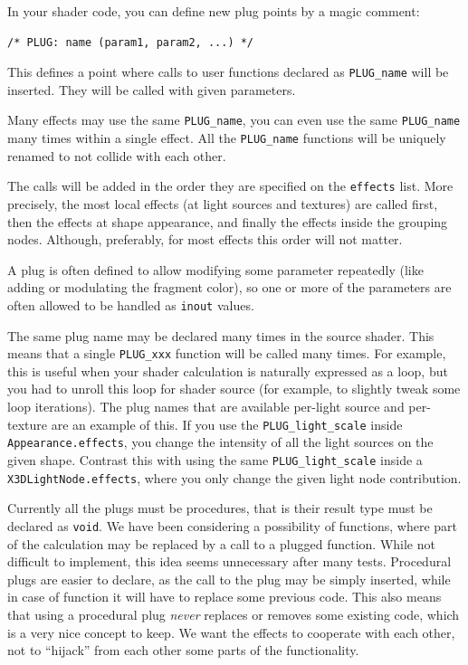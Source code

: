 \documentclass{egpubl}
\newenvironment{mycode}
{\begin{mycodecore}}
{\end{mycodecore}
\vspace{-0.1in}}
\begin{document}
In your shader code, you can define new plug points by a
magic comment:

\begin{mycode}
\begin{Verbatim}[commandchars=\\\{\},fontsize=\small]
/* PLUG: name (param1, param2, ...) */
\end{Verbatim}
\end{mycode}

This defines a point where calls to user functions declared as
\texttt{PLUG\_name} will be inserted. They will be called with given
parameters.

Many effects may use the same \texttt{PLUG\_name},
you can even use the same \texttt{PLUG\_name} many times within a single
effect. All the \texttt{PLUG\_name} functions
will be uniquely renamed to not collide with each other.

The calls will be added in the order they are specified on the
\texttt{effects} list. More precisely, the most local effects
(at light sources and textures) are called first, then the effects
at shape appearance, and finally the effects inside the grouping nodes.
Although, preferably, for most effects this order will not matter.

A plug is often defined to allow modifying some parameter
repeatedly (like adding or modulating the fragment color),
so one or more of the parameters are often allowed to be handled
as \texttt{inout} values.

The same plug name may be declared many times in the source shader.
This means that a single \texttt{PLUG\_xxx} function will be called
many times. For example, this is useful when your shader calculation is naturally
expressed as a loop, but you had to unroll this loop for shader source
(for example, to slightly tweak some loop iterations).
The plug names that are available per-light source and per-texture
are an example of this.
If you use the \texttt{PLUG\_light\_scale}
inside \texttt{Appearance.effects}, you change the intensity
of all the light sources on the given shape. Contrast this with using
the same \texttt{PLUG\_light\_scale} inside a \texttt{X3DLightNode.effects},
where you only change the given light node contribution.

Currently all the plugs must be procedures, that is their result type
must be declared as \texttt{void}. We have been considering
a possibility of functions, where part of the calculation may be replaced
by a call to a plugged function. While not difficult to implement,
this idea seems unnecessary after many tests.
Procedural plugs are easier to declare, as the call to the plug
may be simply inserted, while in case of function it will have to replace
some previous code. This also means that using a procedural plug
\textit{never} replaces or removes some existing code, which is a very nice
concept to keep. We want the effects to cooperate with each other,
not to ``hijack'' from each other some parts of the functionality.
\end{document}

